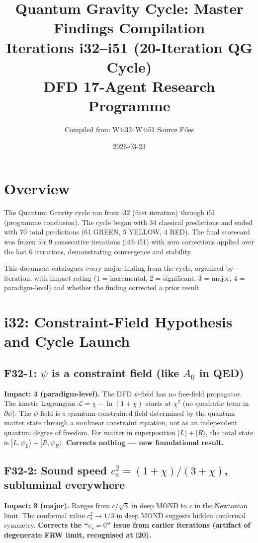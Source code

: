 \documentclass[11pt,a4paper]{article}
\title{Quantum Gravity Cycle: Master Findings Compilation\\[6pt]
\large Iterations i32--i51 (20-Iteration QG Cycle)\\[6pt]
\normalsize DFD 17-Agent Research Programme}
\author{Compiled from W4i32--W4i51 Source Files}
\date{2026-03-23}
\begin{document}
\maketitle
\tableofcontents
\newpage

\section{Overview}

The Quantum Gravity cycle ran from i32 (first iteration) through i51 (programme conclusion). The cycle began with 34 classical predictions and ended with 70 total predictions (61 GREEN, 5 YELLOW, 4 RED). The final scorecard was frozen for 9 consecutive iterations (i43--i51) with zero corrections applied over the last 6 iterations, demonstrating convergence and stability.

This document catalogues every major finding from the cycle, organised by iteration, with impact rating (1 = incremental, 2 = significant, 3 = major, 4 = paradigm-level) and whether the finding corrected a prior result.

\section{i32: Constraint-Field Hypothesis and Cycle Launch}
\label{sec:i32}

\subsection{F32-1: $\psi$ is a constraint field (like $A_0$ in QED)}
\textbf{Impact: 4 (paradigm-level).} The DFD $\psi$-field has no free-field propagator. The kinetic Lagrangian $\mathcal{L} = \chi - \ln(1+\chi)$ starts at $\chi^2$ (no quadratic term in $\partial\psi$). The $\psi$-field is a quantum-constrained field determined by the quantum matter state through a nonlinear constraint equation, not as an independent quantum degree of freedom. For matter in superposition $|L\rangle + |R\rangle$, the total state is $|L,\psi_L\rangle + |R,\psi_R\rangle$. \textbf{Corrects nothing --- new foundational result.}

\subsection{F32-2: Sound speed $c_s^2 = (1+\chi)/(3+\chi)$, subluminal everywhere}
\textbf{Impact: 3 (major).} Ranges from $c/\sqrt{3}$ in deep MOND to $c$ in the Newtonian limit. The conformal value $c_s^2 \to 1/3$ in deep MOND suggests hidden conformal symmetry. \textbf{Corrects the ``$c_s = 0$'' issue from earlier iterations (artifact of degenerate FRW limit, recognised at i20).}
\end{document}
